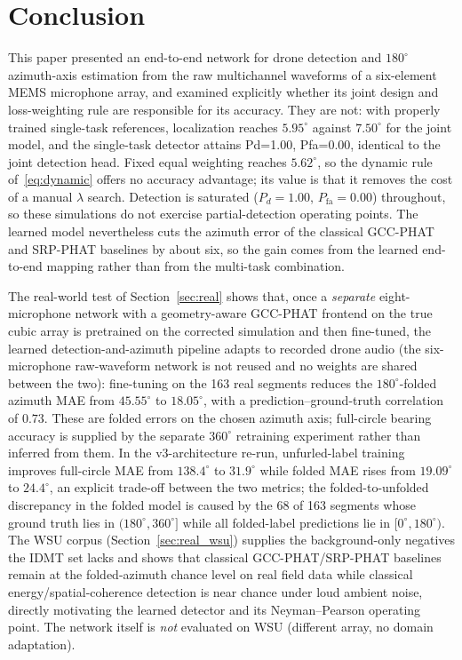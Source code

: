 \documentclass[5p,twocolumn]{elsarticle}
\begin{document}
\section{Conclusion}
\label{sec:conclusion}
This paper presented an end-to-end network for drone detection and $180^\circ$ azimuth-axis estimation from the raw multichannel waveforms of a six-element MEMS microphone array, and examined explicitly whether its joint design and loss-weighting rule are responsible for its accuracy. They are not: with properly trained single-task references, localization reaches $5.95^\circ$ against $7.50^\circ$ for the joint model, and the single-task detector attains Pd=1.00, Pfa=0.00, identical to the joint detection head. Fixed equal weighting reaches $5.62^\circ$, so the dynamic rule of~\eqref{eq:dynamic} offers no accuracy advantage; its value is that it removes the cost of a manual $\lambda$ search. Detection is saturated ($P_d=1.00$, $P_{\mathrm{fa}}=0.00$) throughout, so these simulations do not exercise partial-detection operating points. The learned model nevertheless cuts the azimuth error of the classical GCC-PHAT and SRP-PHAT baselines by about six, so the gain comes from the learned end-to-end mapping rather than from the multi-task combination.

The real-world test of Section~\ref{sec:real} shows that, once a \emph{separate} eight-microphone network with a geometry-aware GCC-PHAT frontend on the true cubic array is pretrained on the corrected simulation and then fine-tuned, the learned detection-and-azimuth pipeline adapts to recorded drone audio (the six-microphone raw-waveform network is not reused and no weights are shared between the two): fine-tuning on the 163 real segments reduces the $180^\circ$-folded azimuth MAE from $45.55^\circ$ to $18.05^\circ$, with a prediction--ground-truth correlation of $0.73$. These are folded errors on the chosen azimuth axis; full-circle bearing accuracy is supplied by the separate $360^\circ$ retraining experiment rather than inferred from them. In the v3-architecture re-run, unfurled-label training improves full-circle MAE from $138.4^\circ$ to $31.9^\circ$ while folded MAE rises from $19.09^\circ$ to $24.4^\circ$, an explicit trade-off between the two metrics; the folded-to-unfolded discrepancy in the folded model is caused by the 68 of 163 segments whose ground truth lies in $(180^\circ,360^\circ]$ while all folded-label predictions lie in $[0^\circ,180^\circ)$. The WSU corpus (Section~\ref{sec:real_wsu}) supplies the background-only negatives the IDMT set lacks and shows that classical GCC-PHAT/SRP-PHAT baselines remain at the folded-azimuth chance level on real field data while classical energy/spatial-coherence detection is near chance under loud ambient noise, directly motivating the learned detector and its Neyman--Pearson operating point. The network itself is \emph{not} evaluated on WSU (different array, no domain adaptation).
\end{document}
